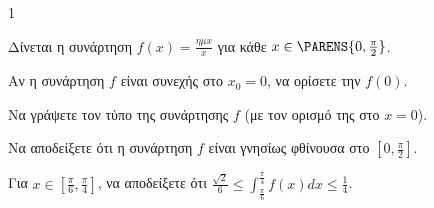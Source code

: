 \begin{ylh}{1}
    \item [Ύλη από εικόνα]
\end{ylh}
Δίνεται η συνάρτηση $f(x) = \frac{\eta \mu x}{x}$ για κάθε $x \in \PARENS{0, \frac{\pi}{2}}$.
\begin{alist}
    \item Αν η συνάρτηση $f$ είναι συνεχής στο $x_0 = 0$, να ορίσετε την $f(0)$. 
    \item Να γράψετε τον τύπο της συνάρτησης $f$ (με τον ορισμό της στο $x=0$). 
    \item Να αποδείξετε ότι η συνάρτηση $f$ είναι γνησίως φθίνουσα στο $\left[0, \frac{\pi}{2}\right]$. 
    \item Για $x \in \left[\frac{\pi}{6}, \frac{\pi}{4}\right]$, να αποδείξετε ότι $\frac{\sqrt{2}}{6} \le \int_{\frac{\pi}{6}}^{\frac{\pi}{4}} f(x) dx \le \frac{1}{4}$. 
\end{alist}